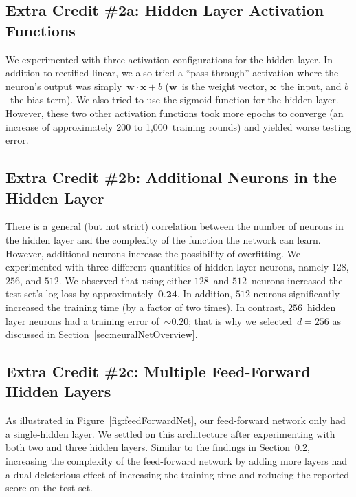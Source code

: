 \documentclass{report}
\begin{document}
  \subsection{Extra Credit \#2a: Hidden Layer Activation Functions}
  
  We experimented with three activation configurations for the hidden layer.  In addition to rectified linear, we also tried a ``pass-through'' activation where the neuron's output was simply~$\textbf{w}\cdot\textbf{x} + b$ ($\textbf{w}$~is the weight vector, $\textbf{x}$~the input, and $b$~the bias term).  We also tried to use the sigmoid function for the hidden layer.  However, these two other activation functions took more epochs to converge (an increase of approximately 200 to 1,000~training rounds) and yielded worse testing error.
  
  \subsection{Extra Credit \#2b: Additional Neurons in the Hidden Layer}\label{sec:ecMoreHiddenLayerNeurons}
  
  There is a general (but not strict) correlation between the number of neurons in the hidden layer and the complexity of the function the network can learn.  However, additional neurons increase the possibility of overfitting.  We experimented with three different quantities of hidden layer neurons, namely $128$, $256$, and $512$.  We observed that using either $128$~and $512$~neurons increased the test set's log loss by approximately~$\textbf{0.24}$.  In addition, $512$ neurons significantly increased the training time (by a factor of two times).  In contrast, $256$~hidden layer neurons had a training error of~${\sim}0.20$; that is why we selected~$d=256$ as discussed in Section~\ref{sec:neuralNetOverview}.
     
  \subsection{Extra Credit \#2c: Multiple Feed-Forward Hidden Layers}
  
  As illustrated in Figure~\ref{fig:feedForwardNet}, our feed-forward network only had a single-hidden layer.  We settled on this architecture after experimenting with both two and three hidden layers.  Similar to the findings in Section~\ref{sec:ecMoreHiddenLayerNeurons}, increasing the complexity of the feed-forward network by adding more layers had a dual deleterious effect of increasing the training time and reducing the reported score on the test set.
     
\end{document}
